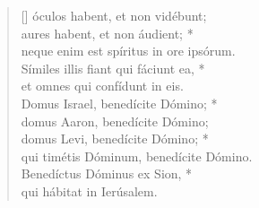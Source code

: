 \begin{verse}[\versewidth]
\vin óculos habent, et non vidébunt;\\
aures habent, et non áudient; *\\
neque enim est spíritus in ore ipsórum.\\
\vin Símiles illis fiant qui fáciunt ea, *\\
\vin et omnes qui confídunt in eis.\\
Domus Israel, benedícite Dómino; *\\
domus Aaron, benedícite Dómino;\\
\vin domus Levi, benedícite Dómino; *\\
\vin qui timétis Dóminum, benedícite Dómino.\\
Benedíctus Dóminus ex Sion, *\\
qui hábitat in Ierúsalem.\\
\end{verse}
\vspace{1cm}


